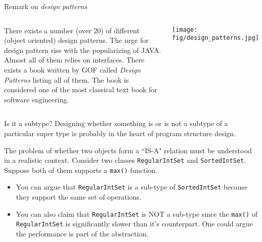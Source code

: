 \begin{frame}{Remark on \textit{design patterns}}
\begin{columns}
	
There exists a number (over 20) of different (object oriented) design patterns. The urge for design pattern rise with the popularizing of JAVA. Almost all of them relies on interfaces. There exists a book written by GOF called \textit{Design Patterns} listing all of them. The book is considered one of the most classical text book for software engineering. 
	
	\vspace{-0.2in}
	\begin{center}
		\texttt{[image: fig/design\_patterns.jpg]}
	\end{center}
\end{columns}
\end{frame}

\begin{frame}{Is it a subtype?}
Designing whether something is or is not a subtype of a particular super type is probably in the heart of program structure design.


The problem of whether two objects form a ``IS-A" relation must be understood in a realistic context. Consider two classes \texttt{RegularIntSet} and \texttt{SortedIntSet}. Suppose both of them supports a \texttt{max()} function.
\begin{itemize}
	\item You can argue that \texttt{RegularIntSet} is a sub-type of \texttt{SortedIntSet} because they support the same set of operations.
	\item You can also claim that \texttt{RegularIntSet} is NOT a sub-type since the \texttt{max()} of \texttt{RegularIntSet} is significantly slower than it's counterpart. One could argue the performance is part of the abstraction.
\end{itemize}
\end{frame}



